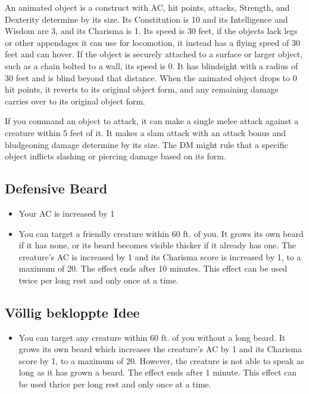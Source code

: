 \documentclass[letterpaper,openany,oneside,twocolumn]{book}
\begin{document}
An animated object is a construct with AC, hit points, attacks, Strength, and Dexterity determine by its size. Its Constitution is 10 and its Intelligence and Wisdom are 3, and its Charisma is 1. Its speed is 30 feet, if the objects lack legs or other appendages it can use for locomotion, it instead has a flying speed of 30 feet and can hover. If the object is securely attached to a surface or larger object, such as a chain bolted to a wall, its speed is 0. It has blindsight with a radius of 30 feet and is blind beyond that distance. When the animated object drops to 0 hit points, it reverts to its original object form, and any remaining damage carries over to its original object form.

If you command an object to attack, it can make a single melee attack against a creature within 5 feet of it. It makes a slam attack with an attack bonus and bludgeoning damage determine by its size. The DM might rule that a specific object inflicts slashing or piercing damage based on its form.

\subsection*{Defensive Beard}
\begin{itemize}
	\item Your AC is increased by 1
	\item You can target a friendly creature within 60 ft. of you. It grows its own beard if it has none, or its beard becomes visible thicker if it already has one. The creature's AC is increased by 1 and its Charisma score is increased by 1, to a maximum of 20. The effect ends after 10 minutes. This effect can be used twice per long rest and only once at a time.
\end{itemize}

\subsection*{Völlig bekloppte Idee}
\begin{itemize}
	\item You can target any creature within 60 ft. of you without a long beard. It grows its own beard which increases the creature's AC by 1 and its Charisma score by 1, to a maximum of 20. However, the creature is not able to speak as long as it has grown a beard. The effect ends after 1 minute. This effect can be used thrice per long rest and only once at a time.
\end{itemize}
\end{document}
